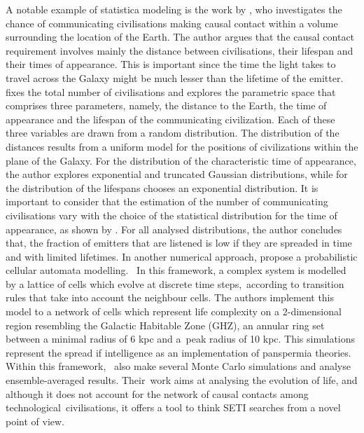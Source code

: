 \documentclass[crop]{CSLB}
\begin{document}
A notable example of statistica modeling is the work by
\citet{balbi_impact_2018}, who investigates the chance of
communicating civilisations making causal contact within a volume
surrounding the location of the Earth.
%
The author argues that the causal contact requirement involves mainly
the distance between civilisations, their lifespan and their times of
appearance.
%
This is important since the time the light takes to travel across the
Galaxy might be much lesser than the lifetime of the emitter.
%
\citet{balbi_impact_2018} fixes the total number of civilisations and
explores the parametric space that comprises three parameters, namely,
the distance to the Earth, the time of appearance and the lifespan of
the communicating civilization.
%
Each of these three variables are drawn from a random distribution.
%
The distribution of the distances results from a uniform model for the
positions of civilizations within the plane of the Galaxy.
%
For the distribution of the characteristic time of appearance, the
author explores exponential and truncated Gaussian distributions,
while for the distribution of the lifespans chooses an exponential
distribution.
%
It is important to consider that the estimation of the number of
communicating civilisations vary with the choice of the statistical
distribution for the time of appearance, as shown by
\citet{balbi_impact_2018}.
%
For all analysed distributions, the author concludes that, the
fraction of emitters that are listened is low if they are spreaded in
time and with limited lifetimes.
%
In another numerical approach, \citet{vukotic_astrobiological_2012}
propose a probabilistic cellular automata modelling. 
%
In this framework, a complex system is modelled by a lattice of cells
which evolve at discrete time steps, according to transition rules
that take into account the neighbour cells.
%
The authors implement this model to a network of cells which represent
life complexity on a 2-dimensional region resembling the Galactic
Habitable Zone (GHZ), an annular ring set between a minimal radius of
6 kpc and a peak radius of 10 kpc.
%
This simulations represent the spread if intelligence as an
implementation of panspermia theories.
%
Within this framework, \citet{vukotic_astrobiological_2012} also make
several Monte Carlo simulations and analyse ensemble-averaged results.
%
Their work aims at analysing the evolution of life, and although it
does not account for the network of causal contacts among
technological civilisations, it offers a tool to think SETI searches
from a novel point of view.
\end{document}
